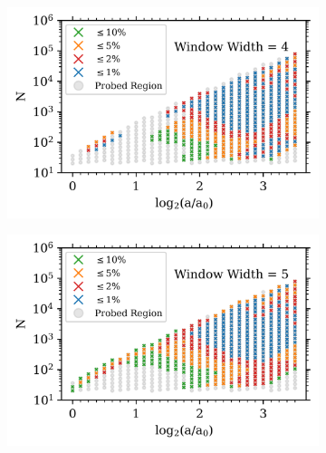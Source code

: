 \begin{figure}
\centering
\begin{subfigure}{.49\textwidth}
\centering
\includegraphics[width=\textwidth]{Ch3_Self_Sim/Appendix_Plots_gtr20/Rockstar_n15_mean_past_joyce_mah_M200c_gtr20_FW_WW4_N_vs_a_convergence_MT2_UVM_with_text_min_1000.png}
\caption{}
\end{subfigure}
\hfil
\begin{subfigure}{.49\textwidth}
\centering
\includegraphics[width=\textwidth]{Ch3_Self_Sim/Appendix_Plots_gtr20/Rockstar_n15_mean_past_joyce_mah_M200c_gtr20_FW_WW5_N_vs_a_convergence_MT2_UVM_with_text_min_1000.png}
\caption{}
\end{subfigure}
\begin{subfigure}{.49\textwidth}
\centering

\end{subfigure}
\end{figure}
